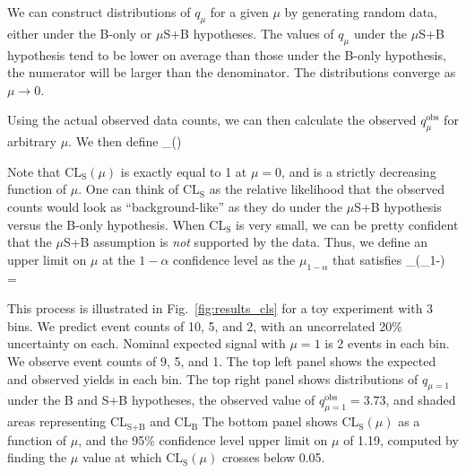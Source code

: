 We can construct distributions of $q_\mu$ for a given $\mu$ by generating random data, either under the B-only
or $\mu$S+B hypotheses. The values of $q_\mu$ under the $\mu$S+B hypothesis tend to be lower on average than those 
under the B-only hypothesis, the numerator will be larger than the denominator. The distributions converge as
$\mu\to0$.

Using the actual observed data counts, we can then calculate the observed $q_\mu^\text{obs}$ for arbitrary $\mu$.
We then define
\be
{}_(\mu) \equiv {} \equiv
{}
\ee

Note that $\text{CL}_\text{S}(\mu)$ is exactly equal to 1 at $\mu=0$, and is a strictly decreasing function of $\mu$.
One can think of $\text{CL}_\text{S}$ as the relative likelihood that the observed counts would look as ``background-like''
as they do under the $\mu$S+B hypothesis versus the B-only hypothesis. When CL$_\text{S}$ is very small,
we can be pretty confident that the $\mu$S+B assumption is \textit{not} supported by the data. Thus, we define
an upper limit on $\mu$ at the $1-\alpha$ confidence level as the $\mu_{1-\alpha}$ that satisfies
\be
{}_(\mu_{1-\alpha}) = \alpha
\ee

This process is illustrated in Fig.~\ref{fig:results_cls} for a toy experiment with 3 bins. We predict event counts of 
10, 5, and 2, with an uncorrelated 20\% uncertainty on each. Nominal expected signal with $\mu=1$ is
2 events in each bin. We observe event counts of 9, 5, and 1. The top left panel shows the expected and observed
yields in each bin. The top right panel shows distributions of $q_{\mu=1}$ under the B and S+B hypotheses, the
observed value of $q_{\mu=1}^\text{obs}=3.73$, and shaded areas representing CL$_\text{S+B}$ and CL$_\text{B}$
The bottom panel shows CL$_\text{S}(\mu)$ as a function of $\mu$, and the 95\% confidence level upper limit
on $\mu$ of 1.19, computed by finding the $\mu$ value at which CL$_\text{S}(\mu)$ crosses below 0.05.

